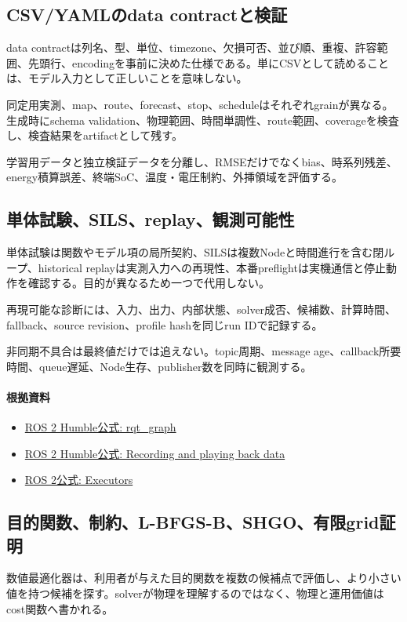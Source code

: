\documentclass[a4paper,11pt]{article}
\begin{document}
\subsection{CSV/YAMLのdata contractと検証}
data contractは列名、型、単位、timezone、欠損可否、並び順、重複、許容範囲、先頭行、encodingを事前に決めた仕様である。単にCSVとして読めることは、モデル入力として正しいことを意味しない。


同定用実測、map、route、forecast、stop、scheduleはそれぞれgrainが異なる。生成時にschema validation、物理範囲、時間単調性、route範囲、coverageを検査し、検査結果をartifactとして残す。


学習用データと独立検証データを分離し、RMSEだけでなくbias、時系列残差、energy積算誤差、終端SoC、温度・電圧制約、外挿領域を評価する。



\subsection{単体試験、SILS、replay、観測可能性}
単体試験は関数やモデル項の局所契約、SILSは複数Nodeと時間進行を含む閉ループ、historical replayは実測入力への再現性、本番preflightは実機通信と停止動作を確認する。目的が異なるため一つで代用しない。


再現可能な診断には、入力、出力、内部状態、solver成否、候補数、計算時間、fallback、source revision、profile hashを同じrun IDで記録する。


非同期不具合は最終値だけでは追えない。topic周期、message age、callback所要時間、queue遅延、Node生存、publisher数を同時に観測する。

\paragraph{根拠資料}
\begin{itemize}[leftmargin=1.6em]
\item \href{https://docs.ros.org/en/ros2_packages/humble/api/rqt_graph/index.html}{ROS 2 Humble公式: rqt\_graph}
\item \href{https://docs.ros.org/en/humble/Tutorials/Beginner-CLI-Tools/Recording-And-Playing-Back-Data/Recording-And-Playing-Back-Data.html}{ROS 2 Humble公式: Recording and playing back data}
\item \href{https://docs.ros.org/en/rolling/Concepts/Intermediate/About-Executors.html}{ROS 2公式: Executors}
\end{itemize}

\subsection{目的関数、制約、L-BFGS-B、SHGO、有限grid証明}
数値最適化器は、利用者が与えた目的関数を複数の候補点で評価し、より小さい値を持つ候補を探す。solverが物理を理解するのではなく、物理と運用価値はcost関数へ書かれる。
\end{document}
